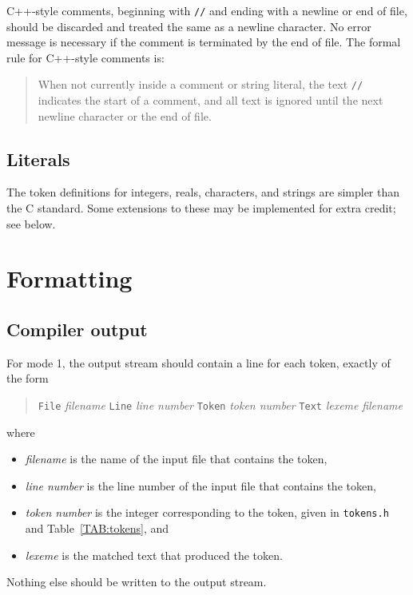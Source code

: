 \documentclass{article}
\begin{document}
C++-style comments, beginning with \verb|//|
and ending with a newline or end of file,
should be discarded and treated the same as a newline character.
No error message is necessary if the comment is terminated by the end of file.
The formal rule for C++-style comments is:
\begin{quote}
	When not currently inside a comment or string literal,
	the text \verb|//| indicates the start of a comment,
	and all text is ignored until the next newline character or the end of file.
\end{quote}

\subsection{Literals}

The token definitions for integers, reals, characters, and strings
are simpler than the C standard.
Some extensions to these may be implemented for extra credit;
see below.


\section{Formatting}

\subsection{Compiler output}

For mode 1, the output stream should contain
a line for each token, exactly of the form
\begin{quote}
	{\tt File}
	\emph{filename}
	{\tt Line}
	\emph{line number}
	{\tt Token}
	\emph{token number}
	{\tt Text}
	\emph{lexeme}
\emph{filename}
\end{quote}
where
\begin{itemize}
	\item \emph{filename}
		is the name of the input file that contains the token,
	\item \emph{line number}
		is the line number of the input file that contains the token,
	\item \emph{token number}
		is the integer corresponding to the token, given in \verb|tokens.h|
		and Table~\ref{TAB:tokens}, and
	\item \emph{lexeme}
		is the matched text that produced the token.
\end{itemize}
Nothing else should be written to the output stream.
\end{document}
